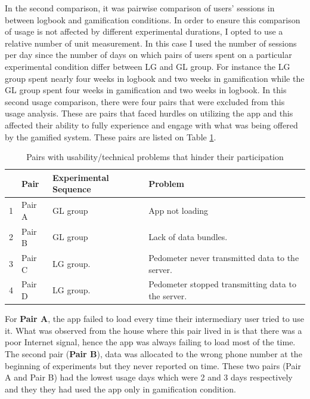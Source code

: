 In the second comparison, it was pairwise comparison of users' sessions in between logbook and gamification conditions. In order to ensure this comparison of usage is not affected by different experimental durations, I opted to use a relative number of unit measurement. In this case I used the number of sessions per day since the number of days on which pairs of users spent on a particular experimental condition differ between LG and GL group. For instance the LG group spent nearly four weeks in logbook and two weeks in gamification while the GL group spent four weeks in gamification and two weeks in logbook. In this second usage comparison, there were four pairs that were excluded from this usage analysis. These are pairs that faced hurdles on utilizing the app and this affected their ability to fully experience and engage with what was being offered by the gamified system. These pairs are listed on Table \ref{table:usageproblems}.
\begin{table}[h!]
  \begin{center}
    \caption{Pairs with usability/technical problems that hinder their participation}
    \label{table:usageproblems}
	\begin{tabular}{|l|l|l|p{6cm}|}
		\hline
		&Pair&Experimental Sequence&Problem\\
		\hline
		1&Pair A&GL group &App not loading\\
		\hline
		2&Pair B&GL group&Lack of data bundles. \\
		\hline
		3&Pair C & LG group.& Pedometer never transmitted data to the server.\\
		\hline
		4&Pair D & LG group.& Pedometer stopped transmitting data to the server.\\
	\hline
	\end{tabular}
  \end{center}
\end{table}
For \textbf{Pair A}, the app failed to load every time their intermediary user tried to use it. What was observed from the house where this pair lived in is that there was a poor Internet signal, hence the app was always failing to load most of the time. The second pair (\textbf{Pair B}), data was allocated to the wrong phone number at the beginning of experiments but they never reported on time. These two pairs (Pair A and Pair B) had the lowest usage days which were 2 and 3 days respectively and they they had used the app only in gamification condition.

